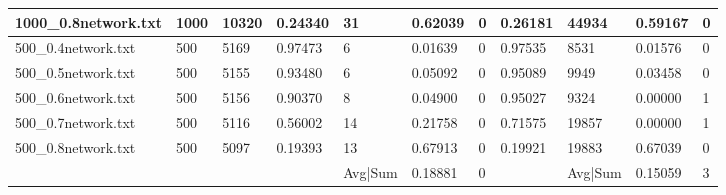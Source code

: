 \begin{sidewaystable}
\begin{tabular}{lllllllllll}
		\multicolumn{1}{|l|}{1000\_0.8network.txt} & \multicolumn{1}{l|}{1000} & \multicolumn{1}{l|}{10320} & \multicolumn{1}{l|}{0.24340} & \multicolumn{1}{l|}{31}    & \multicolumn{1}{l|}{0.62039} & \multicolumn{1}{l|}{0}       & \multicolumn{1}{l|}{0.26181} & \multicolumn{1}{l|}{44934} & \multicolumn{1}{l|}{0.59167} & \multicolumn{1}{l|}{0}       \\ \hline
		\multicolumn{1}{|l|}{500\_0.4network.txt}  & \multicolumn{1}{l|}{500}  & \multicolumn{1}{l|}{5169}  & \multicolumn{1}{l|}{0.97473} & \multicolumn{1}{l|}{6}     & \multicolumn{1}{l|}{0.01639} & \multicolumn{1}{l|}{0}       & \multicolumn{1}{l|}{0.97535} & \multicolumn{1}{l|}{8531}  & \multicolumn{1}{l|}{0.01576} & \multicolumn{1}{l|}{0}       \\ \hline
		\multicolumn{1}{|l|}{500\_0.5network.txt}  & \multicolumn{1}{l|}{500}  & \multicolumn{1}{l|}{5155}  & \multicolumn{1}{l|}{0.93480} & \multicolumn{1}{l|}{6}     & \multicolumn{1}{l|}{0.05092} & \multicolumn{1}{l|}{0}       & \multicolumn{1}{l|}{0.95089} & \multicolumn{1}{l|}{9949}  & \multicolumn{1}{l|}{0.03458} & \multicolumn{1}{l|}{0}       \\ \hline
		\multicolumn{1}{|l|}{500\_0.6network.txt}  & \multicolumn{1}{l|}{500}  & \multicolumn{1}{l|}{5156}  & \multicolumn{1}{l|}{0.90370} & \multicolumn{1}{l|}{8}     & \multicolumn{1}{l|}{0.04900} & \multicolumn{1}{l|}{0}       & \multicolumn{1}{l|}{0.95027} & \multicolumn{1}{l|}{9324}  & \multicolumn{1}{l|}{0.00000} & \multicolumn{1}{l|}{1}       \\ \hline
		\multicolumn{1}{|l|}{500\_0.7network.txt}  & \multicolumn{1}{l|}{500}  & \multicolumn{1}{l|}{5116}  & \multicolumn{1}{l|}{0.56002} & \multicolumn{1}{l|}{14}    & \multicolumn{1}{l|}{0.21758} & \multicolumn{1}{l|}{0}       & \multicolumn{1}{l|}{0.71575} & \multicolumn{1}{l|}{19857} & \multicolumn{1}{l|}{0.00000} & \multicolumn{1}{l|}{1}       \\ \hline
		\multicolumn{1}{|l|}{500\_0.8network.txt}  & \multicolumn{1}{l|}{500}  & \multicolumn{1}{l|}{5097}  & \multicolumn{1}{l|}{0.19393} & \multicolumn{1}{l|}{13}    & \multicolumn{1}{l|}{0.67913} & \multicolumn{1}{l|}{0}       & \multicolumn{1}{l|}{0.19921} & \multicolumn{1}{l|}{19883} & \multicolumn{1}{l|}{0.67039} & \multicolumn{1}{l|}{0}       \\ \hline
		&                           &                            &                              & Avg|Sum                    & 0.18881                      & 0                            &                              & Avg|Sum                    & 0.15059                      & 3                           

\end{tabular}
\end{sidewaystable}
